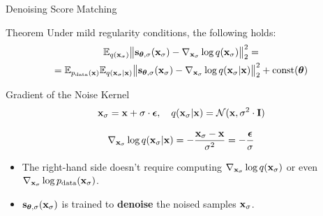 \documentclass{beamer}
\renewcommand{\eqpause}{}
\begin{document}
\begin{frame}{Denoising Score Matching}
	\begin{block}{Theorem}
		Under mild regularity conditions, the following holds:
		\vspace{-0.3cm}
		\begin{multline*}
			\mathbb{E}_{q(\mathbf{x}_{\sigma})}\big\| \mathbf{s}_{\boldsymbol{\theta}, \sigma}(\mathbf{x}_{\sigma}) - \nabla_{\mathbf{x}_{\sigma}} \log q(\mathbf{x}_{\sigma}) \big\|^2_2 = \\
		= \mathbb{E}_{p_{\text{data}}(\mathbf{x})} \mathbb{E}_{q(\mathbf{x}_{\sigma} | \mathbf{x})}\big\| \mathbf{s}_{\boldsymbol{\theta}, \sigma}(\mathbf{x}_{\sigma}) - \nabla_{\mathbf{x}_{\sigma}} \log q(\mathbf{x}_{\sigma} | \mathbf{x}) \big\|^2_2 + \text{const}(\boldsymbol{\theta})
		\end{multline*}
		\vspace{-0.5cm}
	\end{block}
	\eqpause
	\begin{block}{Gradient of the Noise Kernel}
		\vspace{-0.3cm}
		\[
			\mathbf{x}_{\sigma} = \mathbf{x} + \sigma \cdot \boldsymbol{\epsilon}, \quad q(\mathbf{x}_{\sigma} | \mathbf{x}) = \mathcal{N}(\mathbf{x}, \sigma^2 \cdot \mathbf{I})
		\]
		\eqpause
		\vspace{-0.3cm}
		\[
			\nabla_{\mathbf{x}_{\sigma}} \log q(\mathbf{x}_{\sigma} | \mathbf{x}) = - \frac{\mathbf{x}_{\sigma} - \mathbf{x}}{\sigma^2}  = - \frac{\boldsymbol{\epsilon}}{\sigma}
		\]
		\eqpause
		\vspace{-0.5cm}
	\end{block}
	\begin{itemize}
		\item The right-hand side doesn't require computing $\nabla_{\mathbf{x}_{\sigma}} \log q(\mathbf{x}_{\sigma})$ or even $\nabla_{\mathbf{x}_{\sigma}} \log p_{\text{data}}(\mathbf{x}_{\sigma})$.
		\item $\mathbf{s}_{\boldsymbol{\theta}, \sigma}(\mathbf{x}_{\sigma})$ is trained to \textbf{denoise} the noised samples $\mathbf{x}_{\sigma}$.
	\end{itemize}
\end{frame}
\end{document}
